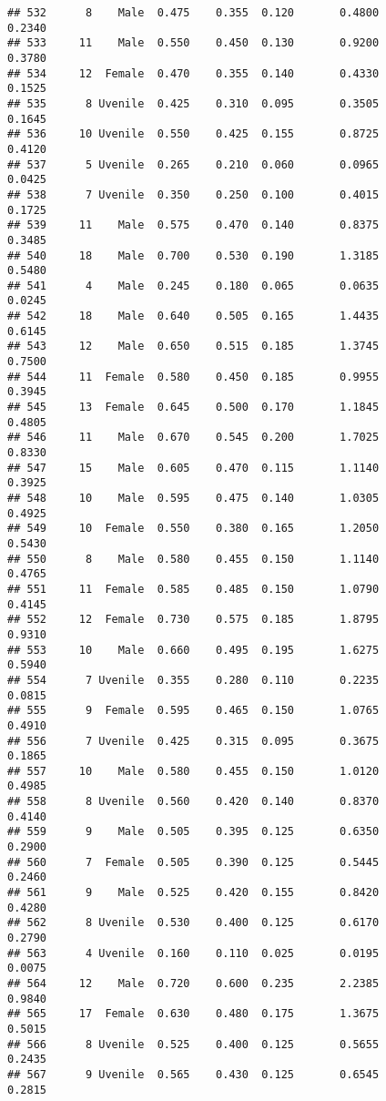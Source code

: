 \documentclass[
]{article}
\begin{document}
\begin{verbatim}
## 532      8    Male  0.475    0.355  0.120       0.4800         0.2340
## 533     11    Male  0.550    0.450  0.130       0.9200         0.3780
## 534     12  Female  0.470    0.355  0.140       0.4330         0.1525
## 535      8 Uvenile  0.425    0.310  0.095       0.3505         0.1645
## 536     10 Uvenile  0.550    0.425  0.155       0.8725         0.4120
## 537      5 Uvenile  0.265    0.210  0.060       0.0965         0.0425
## 538      7 Uvenile  0.350    0.250  0.100       0.4015         0.1725
## 539     11    Male  0.575    0.470  0.140       0.8375         0.3485
## 540     18    Male  0.700    0.530  0.190       1.3185         0.5480
## 541      4    Male  0.245    0.180  0.065       0.0635         0.0245
## 542     18    Male  0.640    0.505  0.165       1.4435         0.6145
## 543     12    Male  0.650    0.515  0.185       1.3745         0.7500
## 544     11  Female  0.580    0.450  0.185       0.9955         0.3945
## 545     13  Female  0.645    0.500  0.170       1.1845         0.4805
## 546     11    Male  0.670    0.545  0.200       1.7025         0.8330
## 547     15    Male  0.605    0.470  0.115       1.1140         0.3925
## 548     10    Male  0.595    0.475  0.140       1.0305         0.4925
## 549     10  Female  0.550    0.380  0.165       1.2050         0.5430
## 550      8    Male  0.580    0.455  0.150       1.1140         0.4765
## 551     11  Female  0.585    0.485  0.150       1.0790         0.4145
## 552     12  Female  0.730    0.575  0.185       1.8795         0.9310
## 553     10    Male  0.660    0.495  0.195       1.6275         0.5940
## 554      7 Uvenile  0.355    0.280  0.110       0.2235         0.0815
## 555      9  Female  0.595    0.465  0.150       1.0765         0.4910
## 556      7 Uvenile  0.425    0.315  0.095       0.3675         0.1865
## 557     10    Male  0.580    0.455  0.150       1.0120         0.4985
## 558      8 Uvenile  0.560    0.420  0.140       0.8370         0.4140
## 559      9    Male  0.505    0.395  0.125       0.6350         0.2900
## 560      7  Female  0.505    0.390  0.125       0.5445         0.2460
## 561      9    Male  0.525    0.420  0.155       0.8420         0.4280
## 562      8 Uvenile  0.530    0.400  0.125       0.6170         0.2790
## 563      4 Uvenile  0.160    0.110  0.025       0.0195         0.0075
## 564     12    Male  0.720    0.600  0.235       2.2385         0.9840
## 565     17  Female  0.630    0.480  0.175       1.3675         0.5015
## 566      8 Uvenile  0.525    0.400  0.125       0.5655         0.2435
## 567      9 Uvenile  0.565    0.430  0.125       0.6545         0.2815

\end{verbatim}
\end{document}
